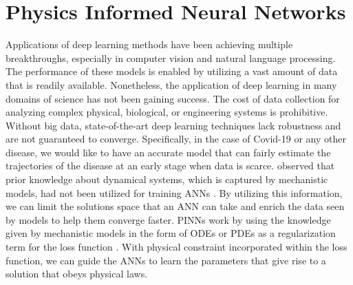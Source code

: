 \section{Physics Informed Neural Networks}
\label{sec:literature-review-physics-informed-neural-network}

Applications of deep learning methods have been achieving multiple breakthroughs, especially in computer vision and natural language processing.
The performance of these models is enabled by utilizing a vast amount of data that is readily available.
Nonetheless, the application of deep learning in many domains of science has not been gaining success.
The cost of data collection for analyzing complex physical, biological, or engineering systems is prohibitive.
Without big data, state-of-the-art deep learning techniques lack robustness and are not guaranteed to converge.
Specifically, in the case of Covid-19 or any other disease, we would like to have an accurate model that can fairly estimate the trajectories of the disease at an early stage when data is scarce.
\citeauthor{raissiPhysicsinformedNeuralNetworks2019} observed that prior knowledge about dynamical systems, which is captured by mechanistic models, had not been utilized for training \glspl{ANN} \cite{raissiPhysicsinformedNeuralNetworks2019}.
By utilizing this information, we can limit the solutions space that an \gls{ANN} can take and enrich the data seen by models to help them converge faster.
\glspl{PINN} work by using the knowledge given by mechanistic models in the form of \glspl{ODE} or \glspl{PDE} as a regularization term for the loss function \cite{raissiPhysicsinformedNeuralNetworks2019, lagarisArtificialNeuralNetworks1998}.
With physical constraint incorporated within the loss function, we can guide the \glspl{ANN} to learn the parameters that give rise to a solution that obeys physical laws.

